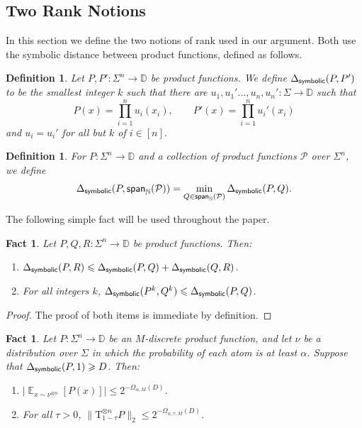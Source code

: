 \documentclass[10pt,a4paper]{amsart}
\newtheorem{fact}[thm]{Fact}
\newtheorem{definition}[thm]{Definition}
\newcommand\card[1]{\left| {#1} \right|}
\newcommand\norm[1]{\| #1 \|}
\newcommand\Expect[2]{{\mathop{\mathbb{E}}_{#1}\left[ {#2} \right]}}
\newcommand\spn{{\sf span}_{\mathbb{N}}}
\renewcommand\geq{\geqslant}
\renewcommand\leq{\leqslant}
\begin{document}
\subsection{Two Rank Notions}
In this section we define the two notions of rank used in our argument. Both use the symbolic distance between product functions, defined as follows.
\begin{definition}
    Let $P,P'\colon \Sigma^n\to\mathbb{D}$ be product functions. We define $\Delta_{{\sf symbolic}}(P,P')$ to be the smallest integer $k$ such that there are $u_1,u_1'\ldots,u_n,u_n'\colon \Sigma\to\mathbb{D}$ such that 
    \[
    P(x) = \prod\limits_{i=1}^{n}u_i(x_i),
    \qquad
    P'(x) = \prod\limits_{i=1}^{n}u_i'(x_i)
    \]
    and $u_i=u_i'$ for all but $k$ of $i\in [n]$.
\end{definition}
\begin{definition}
    For $P\colon\Sigma^{n}\to\mathbb{D}$ and a collection of product functions $\mathcal{P}$ over $\Sigma^n$, we define 
    \[
    \Delta_{{\sf symbolic}}(P,\spn(\mathcal{P}))
    =\min_{Q\in\spn(\mathcal{P})}\Delta_{{\sf symbolic}}(P,Q).
    \]
\end{definition}
The following simple fact will be used throughout the paper.
\begin{fact}\label{fact:symb_dist_prop}
    Let $P,Q,R\colon \Sigma^{n}\to\mathbb{D}$ be product functions. Then:
    \begin{enumerate}
        \item $\Delta_{{\sf symbolic}}(P,R)\leq \Delta_{{\sf symbolic}}(P,Q)+\Delta_{{\sf symbolic}}(Q,R)$.
        \item For all integers $k$, 
        $\Delta_{{\sf symbolic}}(P^k,Q^k)\leq \Delta_{{\sf symbolic}}(P,Q)$.
    \end{enumerate}
\end{fact}
\begin{proof}
    The proof of both items is immediate by definition.
\end{proof}
\begin{fact} \label{fact:highrankdecay}
    Let $P\colon \Sigma^n\to\mathbb{D}$ be an $M$-discrete product function, and let $\nu$ be a distribution over $\Sigma$ in which the probability of each atom is at least $\alpha$. Suppose that $\Delta_{{\sf symbolic}}(P,1)\geq D$. Then:
    \begin{enumerate}
        \item 
        $\card{\Expect{x\sim\nu^{\otimes n}}{P(x)}}\leq 2^{-\Omega_{\alpha, M}(D)}$.
        \item For all $\tau>0$, $\norm{\mathrm{T}_{1-\tau}^{\otimes n}
        P}_2\leq 2^{-\Omega_{\alpha,\tau, M}(D)}$.
    \end{enumerate}
\end{fact}
\end{document}
